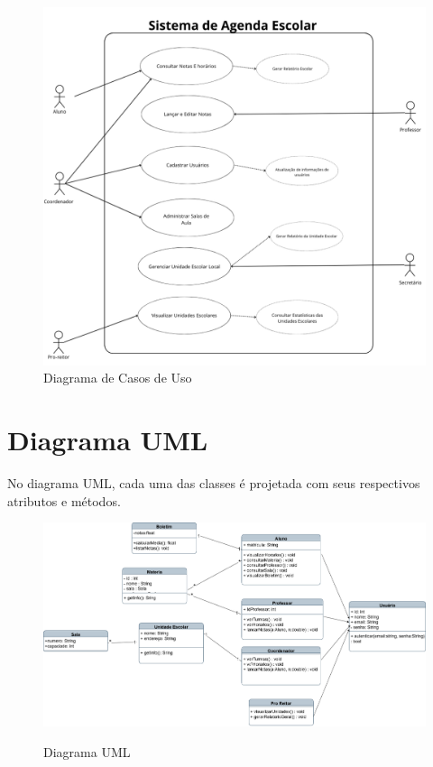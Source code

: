 \documentclass[12pt,a4paper]{report}
\begin{document}
\begin{figure}[!h]
	\centering
	\includegraphics[scale=0.5]{imagens/casodeuso.png}
	\caption{Diagrama de Casos de Uso}
	\label{Diagrama de Casos de Uso}
\end{figure}

\section{Diagrama UML}
No diagrama UML, cada uma das classes é projetada com seus respectivos atributos e métodos.

\begin{figure}[!h]
	\centering
	\includegraphics[width = \linewidth]{imagens/uml.png}
	\label{Diagrama UML}
	\caption{Diagrama UML}
\end{figure}
\newpage
\end{document}
